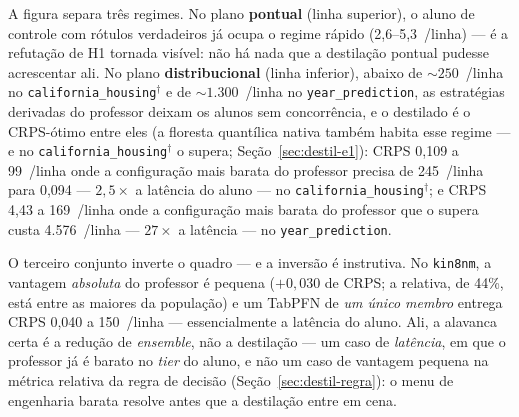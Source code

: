 A figura separa três regimes. No plano \textbf{pontual} (linha
superior), o aluno de controle com rótulos verdadeiros já ocupa o
regime rápido (2,6--5,3~\us/linha) --- é a refutação de H1 tornada
visível: não há nada que a destilação pontual pudesse acrescentar ali.
No plano \textbf{distribucional} (linha inferior), abaixo de
${\sim}250$~\us/linha no \texttt{california\_\allowbreak housing}$^\dagger$ e de
${\sim}1.300$~\us/linha no \texttt{year\_\allowbreak prediction}, as estratégias
derivadas do professor deixam os alunos sem concorrência, e o
destilado é o
CRPS-ótimo entre eles (a floresta quantílica nativa também
habita esse regime --- e no \texttt{california\_\allowbreak housing}$^\dagger$
o supera;
Seção~\ref{sec:destil-e1}): CRPS 0,109 a
99~\us/linha onde a configuração mais barata do professor precisa de
245~\us/linha para 0,094 --- $2{,}5\times$ a latência do aluno --- no
\texttt{california\_\allowbreak housing}$^\dagger$; e CRPS 4,43 a 169~\us/linha onde a
configuração mais barata do professor que o supera custa
4.576~\us/linha --- $27\times$ a latência --- no
\texttt{year\_\allowbreak prediction}.

O terceiro conjunto inverte o quadro --- e a inversão é instrutiva. No
\texttt{kin8nm}, a vantagem \emph{absoluta} do professor é pequena
($+0{,}030$ de CRPS; a relativa, de 44\%, está entre as maiores da
população)
e um TabPFN de \emph{um único membro} entrega CRPS 0,040 a
150~\us/linha --- essencialmente a latência do aluno. Ali, a alavanca
certa é a redução de \emph{ensemble}, não a destilação --- um caso
de \emph{latência}, em que o professor já é barato no \emph{tier}
do aluno, e não um caso de vantagem pequena na métrica relativa da
regra de decisão
(Seção~\ref{sec:destil-regra}): o menu de engenharia barata resolve
antes que a destilação
entre em cena.

